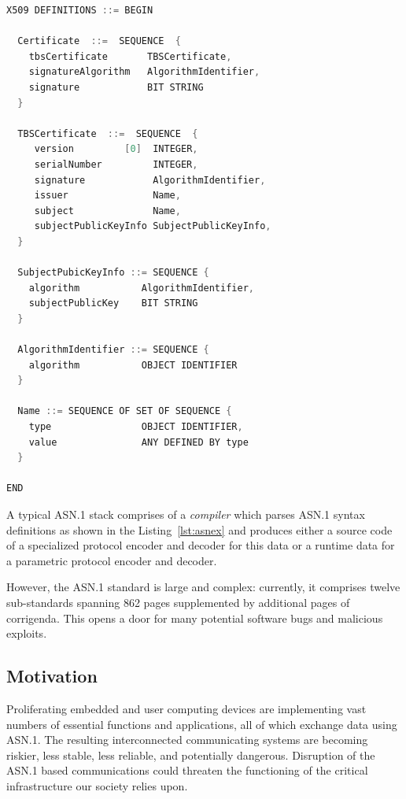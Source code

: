 \documentclass[acmsmall,nonacm]{acmart}
\begin{document}
\begin{lstlisting}[language=C,label=lst:asnex,
  caption={ASN.1 example of X.509 certificates, adapted for brevity}]
X509 DEFINITIONS ::= BEGIN

  Certificate  ::=  SEQUENCE  {
    tbsCertificate       TBSCertificate,
    signatureAlgorithm   AlgorithmIdentifier,
    signature            BIT STRING
  }

  TBSCertificate  ::=  SEQUENCE  {
     version         [0]  INTEGER,
     serialNumber         INTEGER,
     signature            AlgorithmIdentifier,
     issuer               Name,
     subject              Name,
     subjectPublicKeyInfo SubjectPublicKeyInfo,
  }

  SubjectPubicKeyInfo ::= SEQUENCE {
    algorithm           AlgorithmIdentifier,
    subjectPublicKey    BIT STRING
  }

  AlgorithmIdentifier ::= SEQUENCE {
    algorithm           OBJECT IDENTIFIER
  }

  Name ::= SEQUENCE OF SET OF SEQUENCE {
    type                OBJECT IDENTIFIER,
    value               ANY DEFINED BY type
  }

END
\end{lstlisting}


A typical ASN.1 stack comprises of a \textit{compiler} which parses
ASN.1 syntax definitions as shown in the Listing~\ref{lst:asnex} and
produces either a source code of a specialized protocol encoder and
decoder for this data or a runtime data for a parametric protocol
encoder and decoder.

However, the ASN.1 standard \cite{ASN1Intro} is large and complex:
currently, it comprises twelve sub-standards spanning 862 pages
supplemented by additional pages of corrigenda\cite{ASN1Intro}. This opens
a door for many potential software bugs and malicious exploits.
  
\subsection{Motivation}

Proliferating embedded and user computing devices are implementing
vast numbers of essential functions and applications, all of which
exchange data using ASN.1. The resulting interconnected communicating
systems are becoming riskier, less stable, less reliable, and
potentially dangerous. Disruption of the ASN.1 based communications
could threaten the functioning of the critical infrastructure our
society relies upon.
\end{document}
